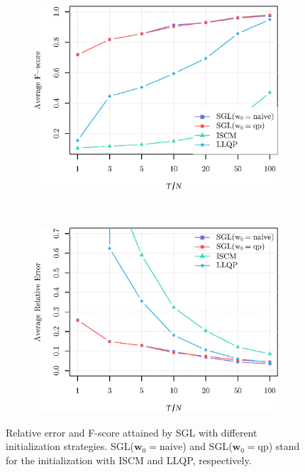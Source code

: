 \begin{figure}[!htb]
    \centering
    \begin{subfigure}[b]{0.45\textwidth}
        \includegraphics[width=\textwidth]{initial_guess/fscore.eps}
    \end{subfigure}
    ~ %
    \begin{subfigure}[b]{0.45\textwidth}
        \includegraphics[width=\textwidth]{initial_guess/relative_error.eps}
    \end{subfigure}
    \caption{Relative error and F-score attained by \textsf{SGL} with different initialization strategies.
             \textsf{SGL}($\mathbf{w}_0 = \text{naive}$) and \textsf{SGL}($\mathbf{w}_0 = \text{qp}$)
           stand for the initialization with \textsf{ISCM} and \textsf{LLQP}, respectively.}
    \label{fig:initial-guess}
\end{figure}
